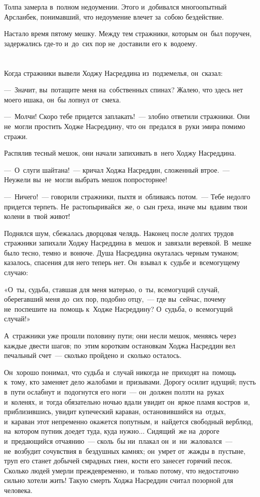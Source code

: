 \documentclass[12pt,a4paper]{book}
\begin{document}
Толпа замерла в~полном недоумении. Этого и~добивался многоопытный Арсланбек, понимавший, что недоумение влечет за~собою бездействие.

Настало время пятому мешку. Между тем стражники, которым он~был поручен, задержались где-то и~до~сих пор не~доставили его к~водоему.


\chapter{}

Когда стражники вывели Ходжу Насреддина из~подземелья, он~сказал:

—~Значит, вы~потащите меня на~собственных спинах? Жалею, что здесь нет моего ишака, он~бы лопнул от~смеха.

—~Молчи! Скоро тебе придется заплакать!~— злобно ответили стражники. Они не~могли простить Ходже Насреддину, что он~предался в~руки эмира помимо стражи.

Распялив тесный мешок, они начали запихивать в~него Ходжу Насреддина.

—~О~слуги шайтана!~— кричал Ходжа Насреддин, сложенный втрое.~— Неужели вы~не~могли выбрать мешок попросторнее!

—~Ничего!~— говорили стражники, пыхтя и~обливаясь потом.~— Тебе недолго придется терпеть. Не~растопыривайся~же, о~сын греха, иначе мы~вдавим твои колени в~твой живот!

Поднялся шум, сбежалась дворцовая челядь. Наконец после долгих трудов стражники запихали Ходжу Насреддина в~мешок и~завязали веревкой. В~мешке было тесно, темно и~вонюче. Душа Насреддина окуталась черным туманом; казалось, спасения для него теперь нет. Он~взывал к~судьбе и~всемогущему случаю:

«О~ты, судьба, ставшая для меня матерью, о~ты, всемогущий случай, оберегавший меня до~сих пор, подобно отцу,~— где вы~сейчас, почему не~поспешите на~помощь к~Ходже Насреддину? О~судьба, о~всемогущий случай!»

А~стражники уже прошли половину пути; они несли мешок, меняясь через каждые двести шагов; по~этим коротким остановкам Ходжа Насреддин вел печальный счет~— сколько пройдено и~сколько осталось.

Он~хорошо понимал, что судьба и~случай никогда не~приходят на~помощь к~тому, кто заменяет дело жалобами и~призывами. Дорогу осилит идущий; пусть в~пути ослабнут и~подогнутся его ноги~— он~должен ползти на~руках и~коленях, и~тогда обязательно ночью вдали увидит он~яркое пламя костров~и, приблизившись, увидит купеческий караван, остановившийся на~отдых, и~караван этот непременно окажется попутным, и~найдется свободный верблюд, на~котором путник доедет туда, куда нужно... Сидящий~же на~дороге и~предающийся отчаянию~— сколь~бы ни~плакал он~и~ни~жаловался~— не~возбудит сочувствия в~бездушных камнях; он~умрет от~жажды в~пустыне, труп его станет добычей смрадных гиен, кости его занесет горячий песок. Сколько людей умерли преждевременно, и~только потому, что недостаточно сильно хотели жить! Такую смерть Ходжа Насреддин считал позорной для человека.
\end{document}
